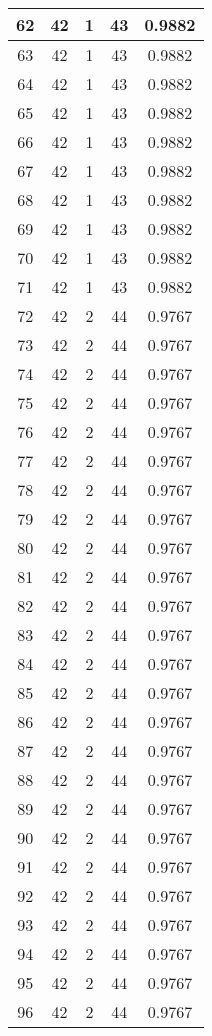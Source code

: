\documentclass[letterpaper, 12pt]{article}
\begin{document}
\begin{longtable}{|c|c|c|c|c|}
\hline
62 & 42 & 1 & 43 & 0.9882 \\
\hline
63 & 42 & 1 & 43 & 0.9882 \\
\hline
64 & 42 & 1 & 43 & 0.9882 \\
\hline
65 & 42 & 1 & 43 & 0.9882 \\
\hline
66 & 42 & 1 & 43 & 0.9882 \\
\hline
67 & 42 & 1 & 43 & 0.9882 \\
\hline
68 & 42 & 1 & 43 & 0.9882 \\
\hline
69 & 42 & 1 & 43 & 0.9882 \\
\hline
70 & 42 & 1 & 43 & 0.9882 \\
\hline
71 & 42 & 1 & 43 & 0.9882 \\
\hline
72 & 42 & 2 & 44 & 0.9767 \\
\hline
73 & 42 & 2 & 44 & 0.9767 \\
\hline
74 & 42 & 2 & 44 & 0.9767 \\
\hline
75 & 42 & 2 & 44 & 0.9767 \\
\hline
76 & 42 & 2 & 44 & 0.9767 \\
\hline
77 & 42 & 2 & 44 & 0.9767 \\
\hline
78 & 42 & 2 & 44 & 0.9767 \\
\hline
79 & 42 & 2 & 44 & 0.9767 \\
\hline
80 & 42 & 2 & 44 & 0.9767 \\
\hline
81 & 42 & 2 & 44 & 0.9767 \\
\hline
82 & 42 & 2 & 44 & 0.9767 \\
\hline
83 & 42 & 2 & 44 & 0.9767 \\
\hline
84 & 42 & 2 & 44 & 0.9767 \\
\hline
85 & 42 & 2 & 44 & 0.9767 \\
\hline
86 & 42 & 2 & 44 & 0.9767 \\
\hline
87 & 42 & 2 & 44 & 0.9767 \\
\hline
88 & 42 & 2 & 44 & 0.9767 \\
\hline
89 & 42 & 2 & 44 & 0.9767 \\
\hline
90 & 42 & 2 & 44 & 0.9767 \\
\hline
91 & 42 & 2 & 44 & 0.9767 \\
\hline
92 & 42 & 2 & 44 & 0.9767 \\
\hline
93 & 42 & 2 & 44 & 0.9767 \\
\hline
94 & 42 & 2 & 44 & 0.9767 \\
\hline
95 & 42 & 2 & 44 & 0.9767 \\
\hline
96 & 42 & 2 & 44 & 0.9767 \\

\end{longtable}
\end{document}
